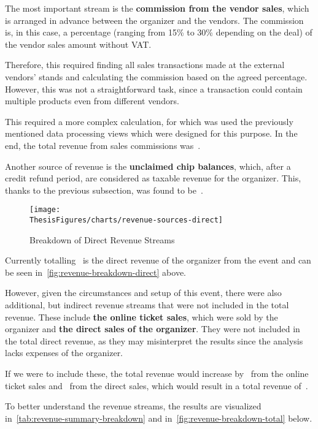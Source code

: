 The most important stream is the \textbf{commission from the vendor sales}, which is arranged in advance between the organizer and the vendors.
The commission is, in this case, a percentage (ranging from 15\% to 30\% depending on the deal) of the vendor sales amount without VAT\@.

Therefore, this required finding all sales transactions made at the external vendors' stands and calculating the commission based on the agreed percentage.
However, this was not a straightforward task, since a transaction could contain multiple products even from different vendors.

This required a more complex calculation, for which was used the previously mentioned data processing views which were designed for this purpose.
In the end, the total revenue from sales commissions was~.

Another source of revenue is the \textbf{unclaimed chip balances}, which, after a credit refund period, are considered as taxable revenue for the organizer.
This, thanks to the previous subsection, was found to be~.

\begin{figure}[H]
	\centering
	\texttt{[image: \\ThesisFigures/charts/revenue-sources-direct]}
	\caption{Breakdown of Direct Revenue Streams}
	\label{fig:revenue-breakdown-direct}
	\source
\end{figure}

Currently totalling~ is the direct revenue of the organizer from the event and can be seen in~\autoref{fig:revenue-breakdown-direct} above.

However, given the circumstances and setup of this event, there were also additional, but indirect revenue streams that were not included in the total revenue.
These include \textbf{the online ticket sales}, which were sold by the organizer and \textbf{the direct sales of the organizer}.
They were not included in the total direct revenue, as they may misinterpret the results since the analysis lacks expenses of the organizer.

If we were to include these, the total revenue would increase by~ from the online ticket sales and~ from the direct sales, which would result in a total revenue of~.

To better understand the revenue streams, the results are visualized in~\autoref{tab:revenue-summary-breakdown} and in~\autoref{fig:revenue-breakdown-total} below.

